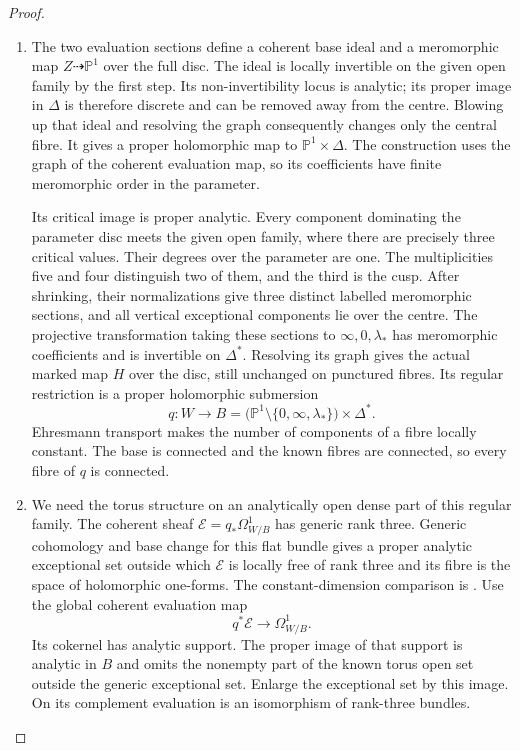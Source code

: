 \documentclass[11pt,a4paper]{article}
\theoremstyle{definition}
\begin{document}
\begin{proof}
\begin{enumerate}[label=\arabic*.]
\item The two evaluation sections define a coherent base ideal and
a meromorphic map $Z\dashrightarrow\mathbb P^1$ over the full
disc.  The ideal is locally invertible on the given open family
by the first step.  Its non-invertibility locus is analytic;
its proper image in $\Delta$ is therefore discrete and can be
removed away from the centre.  Blowing up that ideal and
resolving the graph consequently changes only the central
fibre.  It gives a proper holomorphic map to
$\mathbb P^1\times\Delta$.  The construction uses the graph
of the coherent evaluation map, so its coefficients have
finite meromorphic order in the parameter.

Its critical image is proper analytic.  Every component
dominating the parameter disc meets the given open family,
where there are precisely three critical values.  Their
degrees over the parameter are one.  The multiplicities five
and four distinguish two of them, and the third is the cusp.
After shrinking, their normalizations give three distinct
labelled meromorphic sections, and all vertical exceptional
components lie over the centre.  The projective transformation
taking these sections to $\infty,0,\lambda_*$ has meromorphic
coefficients and is invertible on $\Delta^*$.  Resolving its
graph gives the actual marked map $H$ over the disc, still
unchanged on punctured fibres.  Its regular restriction is a
proper holomorphic submersion
\[
 q:W\longrightarrow
 B=\bigl(\mathbb P^1\setminus\{0,\infty,\lambda_*\}\bigr)
          \times\Delta^*.
\]
Ehresmann transport makes the number of components of a fibre
locally constant.  The base is connected and the known fibres
are connected, so every fibre of $q$ is connected.

\item We need the torus structure on an analytically open dense
part of this regular family.  The coherent sheaf
$\mathcal E=q_*\Omega^1_{W/B}$ has generic rank three.
Generic cohomology and base change for this flat bundle gives
a proper analytic exceptional set outside which $\mathcal E$
is locally free of rank three and its fibre is the space of
holomorphic one-forms.  The constant-dimension comparison is
\cite[\S7, Satz 5, pp.~63--64]{Grauert60}.
Use the global coherent evaluation map
\[
 q^*\mathcal E\longrightarrow\Omega^1_{W/B}.
\]
Its cokernel has analytic support.  The proper image of that
support is analytic in $B$ and omits the nonempty part of the
known torus open set outside the generic exceptional set.
Enlarge the exceptional set by this image.  On its complement
evaluation is an isomorphism of rank-three bundles.


\end{enumerate}
\end{proof}
\end{document}
